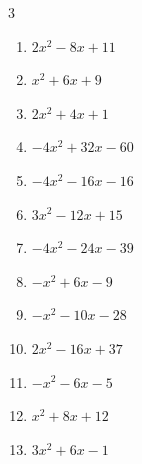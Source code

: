 \begin{multicols}{3}
\begin{enumerate}
  \item $2x^{2}-8x+11$


  \item $x^{2}+6x+9$


\columnbreak %

  \item $2x^{2}+4x+1$


  \item $-4x^{2}+32x-60$


  \item $-4x^{2}-16x-16$


  \item $3x^{2}-12x+15$


  \item $-4x^{2}-24x-39$


  \item $-x^{2}+6x-9$


  \item $-x^{2}-10x-28$


  \item $2x^{2}-16x+37$


  \item $-x^{2}-6x-5$


  \item $x^{2}+8x+12$


\columnbreak %

  \item $3x^{2}+6x-1$



\end{enumerate}
\end{multicols}
